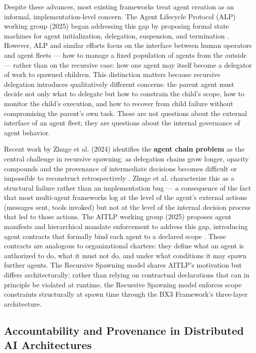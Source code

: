 Despite these advances, most existing frameworks treat agent creation as an informal, implementation-level concern. The Agent Lifecycle Protocol (ALP) working group (2025) began addressing this gap by proposing formal state machines for agent initialization, delegation, suspension, and termination \cite{alp2025}. However, ALP and similar efforts focus on the interface between human operators and agent fleets — how to manage a fixed population of agents from the outside — rather than on the recursive case: how one agent may itself become a delegator of work to spawned children. This distinction matters because recursive delegation introduces qualitatively different concerns: the parent agent must decide not only what to delegate but how to constrain the child's scope, how to monitor the child's execution, and how to recover from child failure without compromising the parent's own task. These are not questions about the external interface of an agent fleet; they are questions about the internal governance of agent behavior.

Recent work by Zhuge et al. (2024) identifies the \textbf{agent chain problem} as the central challenge in recursive spawning: as delegation chains grow longer, opacity compounds and the provenance of intermediate decisions becomes difficult or impossible to reconstruct retrospectively \cite{zhuge2024}. Zhuge et al. characterize this as a structural failure rather than an implementation bug — a consequence of the fact that most multi-agent frameworks log at the level of the agent's external actions (messages sent, tools invoked) but not at the level of the internal decision process that led to those actions. The AITLP working group (2025) proposes agent manifests and hierarchical mandate enforcement to address this gap, introducing agent contracts that formally bind each agent to a declared scope \cite{aitlp2025draft}. These contracts are analogous to organizational charters: they define what an agent is authorized to do, what it must not do, and under what conditions it may spawn further agents. The Recursive Spawning model shares AITLP's motivation but differs architecturally: rather than relying on contractual declarations that can in principle be violated at runtime, the Recursive Spawning model enforces scope constraints structurally at spawn time through the BX3 Framework's three-layer architecture.

\subsection{Accountability and Provenance in Distributed AI Architectures}
\label{sec:provenance}

